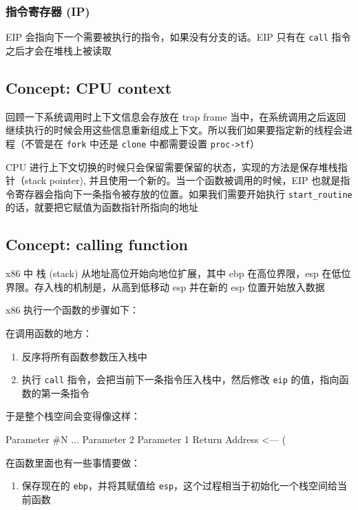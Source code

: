 \subsubsection{指令寄存器 (IP)}

EIP 会指向下一个需要被执行的指令，如果没有分支的话。EIP 只有在 \texttt{call} 指令之后才会在堆栈上被读取

\subsection{Concept: CPU context}

回顾一下系统调用时上下文信息会存放在 trap frame 当中，在系统调用之后返回继续执行的时候会用这些信息重新组成上下文。所以我们如果要指定新的线程会进程（不管是在 \texttt{fork} 中还是 \texttt{clone} 中都需要设置 \texttt{proc->tf}）

CPU 进行上下文切换的时候只会保留需要保留的状态，实现的方法是保存堆栈指针（stack pointer), 并且使用一个新的。当一个函数被调用的时候，EIP 也就是指令寄存器会指向下一条指令被存放的位置。如果我们需要开始执行 \texttt{start\_routine} 的话，就要把它赋值为函数指针所指向的地址

\subsection{Concept: calling function}

x86 中 栈 (stack) 从地址高位开始向地位扩展，其中 ebp 在高位界限，esp 在低位界限。存入栈的机制是，从高到低移动 esp 并在新的 esp 位置开始放入数据

x86 执行一个函数的步骤如下：

在调用函数的地方：

\begin{enumerate}
    \item 反序将所有函数参数压入栈中
    \item 执行 \texttt{call} 指令，会把当前下一条指令压入栈中，然后修改 \texttt{eip} 的值，指向函数的第一条指令
\end{enumerate}

于是整个栈空间会变得像这样：

\begin{textcode}
    Parameter #N
    ...
    Parameter 2
    Parameter 1
    Return Address <--- (%
\end{textcode}


在函数里面也有一些事情要做：

\begin{enumerate}
    \item 保存现在的 \texttt{ebp}，并将其赋值给 \texttt{esp}，这个过程相当于初始化一个栈空间给当前函数
\end{enumerate}

